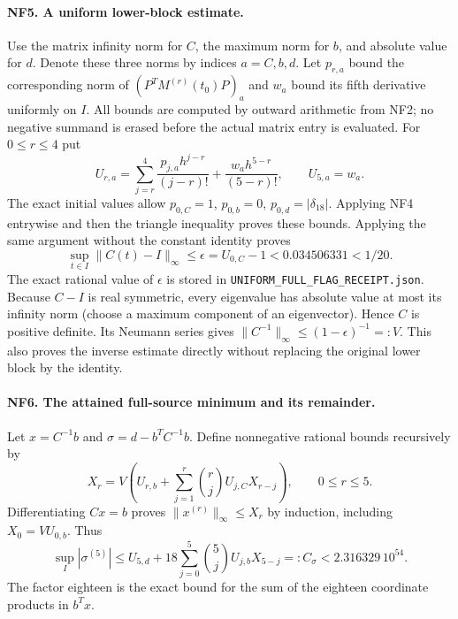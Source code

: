 \paragraph{NF5. A uniform lower-block estimate.}
Use the matrix infinity norm for $C$, the maximum norm for $b$,
and absolute value for $d$. Denote these three norms by indices
$a=C,b,d$. Let $p_{r,a}$ bound the corresponding norm of
$(P^TM^{(r)}(t_0)P)_a$ and $w_a$ bound its fifth derivative
uniformly on $I$. All bounds are computed by outward arithmetic
from NF2; no negative summand is erased before the actual matrix
entry is evaluated. For $0\le r\le4$ put
\[
 U_{r,a}=\sum_{j=r}^4\frac{p_{j,a}h^{j-r}}{(j-r)!}
             +\frac{w_a h^{5-r}}{(5-r)!},\qquad U_{5,a}=w_a.
 \tag{NF11}
\]
The exact initial values allow $p_{0,C}=1$, $p_{0,b}=0$,
$p_{0,d}=|\delta_{18}|$. Applying NF4 entrywise and then the
triangle inequality proves these bounds. Applying the same
argument without the constant identity proves
\[
 \sup_{t\in I}\|C(t)-I\|_\infty
 \le\epsilon=U_{0,C}-1
 <0.034506331<1/20.
 \tag{NF12}
\]
The exact rational value of $\epsilon$ is stored in
\texttt{UNIFORM\_FULL\_FLAG\_RECEIPT.json}.
Because $C-I$ is real symmetric, every eigenvalue has absolute
value at most its infinity norm (choose a maximum component of
an eigenvector). Hence $C$ is positive definite. Its Neumann
series gives $\|C^{-1}\|_\infty\le(1-\epsilon)^{-1}=:V$.
This also proves the inverse estimate directly without replacing
the original lower block by the identity.

\paragraph{NF6. The attained full-source minimum and its remainder.}
Let $x=C^{-1}b$ and $\sigma=d-b^TC^{-1}b$. Define nonnegative
rational bounds recursively by
\[
 X_r=V\left(U_{r,b}+\sum_{j=1}^r\binom rj U_{j,C}X_{r-j}\right),
 \qquad0\le r\le5.
 \tag{NF13}
\]
Differentiating $Cx=b$ proves $\|x^{(r)}\|_\infty\le X_r$ by
induction, including $X_0=VU_{0,b}$. Thus
\[
 \sup_I|\sigma^{(5)}|
 \le U_{5,d}+18\sum_{j=0}^5\binom5j U_{j,b}X_{5-j}
 =:C_\sigma<2.316329\,10^{54}.
 \tag{NF14}
\]
The factor eighteen is the exact bound for the sum of the
eighteen coordinate products in $b^Tx$.

